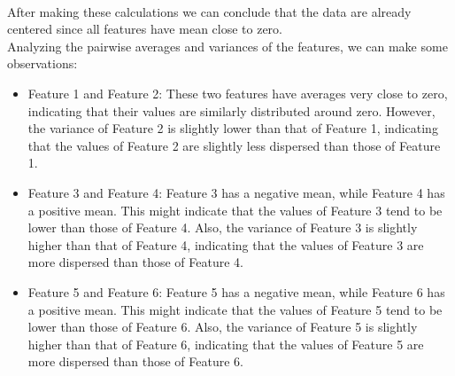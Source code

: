 \documentclass{article}
\begin{document}
    \\
After making these calculations we can conclude that the data are already centered since all features have mean close to zero.\\
Analyzing the pairwise averages and variances of the features, we can make some observations:  
\begin{itemize}
    \item Feature 1 and Feature 2: These two features have averages very close to zero, indicating that their values are similarly distributed around zero. However, the variance of Feature 2 is slightly lower than that of Feature 1, indicating that the values of Feature 2 are slightly less dispersed than those of Feature 1.  
    \item Feature 3 and Feature 4: Feature 3 has a negative mean, while Feature 4 has a positive mean. This might indicate that the values of Feature 3 tend to be lower than those of Feature 4. Also, the variance of Feature 3 is slightly higher than that of Feature 4, indicating that the values of Feature 3 are more dispersed than those of Feature 4.  
    \item Feature 5 and Feature 6: Feature 5 has a negative mean, while Feature 6 has a positive mean. This might indicate that the values of Feature 5 tend to be lower than those of Feature 6. Also, the variance of Feature 5 is slightly higher than that of Feature 6, indicating that the values of Feature 5 are more dispersed than those of Feature 6. 
\end{itemize}
\end{document}
